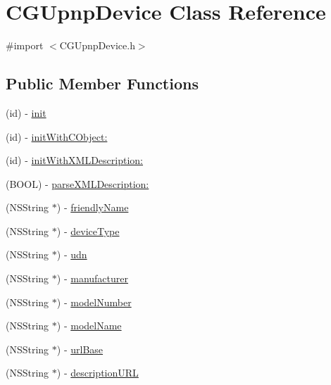 \hypertarget{interface_c_g_upnp_device}{\section{C\-G\-Upnp\-Device Class Reference}
\label{interface_c_g_upnp_device}
}


{\ttfamily \#import $<$C\-G\-Upnp\-Device.\-h$>$}

\subsection*{Public Member Functions}
\begin{DoxyCompactItemize}
\item 
(id) -\/ \hyperlink{interface_c_g_upnp_device_aa0351efbdcee98c85687861faab2d372}{init}
\item 
(id) -\/ \hyperlink{interface_c_g_upnp_device_a4f3984ff48e69ce3c113f960e8a189f6}{init\-With\-C\-Object\-:}
\item 
(id) -\/ \hyperlink{interface_c_g_upnp_device_a0ee734df1783cd9025e7f0efcf3e133f}{init\-With\-X\-M\-L\-Description\-:}
\item 
(B\-O\-O\-L) -\/ \hyperlink{interface_c_g_upnp_device_ac86396c6f776f9436e2b0f92dea8ea03}{parse\-X\-M\-L\-Description\-:}
\item 
(N\-S\-String $\ast$) -\/ \hyperlink{interface_c_g_upnp_device_ae15d569f7de9cbc9aa751d380e2fd8f1}{friendly\-Name}
\item 
(N\-S\-String $\ast$) -\/ \hyperlink{interface_c_g_upnp_device_a626b42555e6122b8ec08877981a9b515}{device\-Type}
\item 
(N\-S\-String $\ast$) -\/ \hyperlink{interface_c_g_upnp_device_ad55f10ba9d5f371835148797fcebfd36}{udn}
\item 
(N\-S\-String $\ast$) -\/ \hyperlink{interface_c_g_upnp_device_a5f496c54e490738ac1d2aac0b1907ca8}{manufacturer}
\item 
(N\-S\-String $\ast$) -\/ \hyperlink{interface_c_g_upnp_device_af1bcb76a0ddf6530179f224802fdab2f}{model\-Number}
\item 
(N\-S\-String $\ast$) -\/ \hyperlink{interface_c_g_upnp_device_ae4b4ac9f466da8f9e7d5567a1f7ac9f2}{model\-Name}
\item 
(N\-S\-String $\ast$) -\/ \hyperlink{interface_c_g_upnp_device_a080173980569b451fafa717eec9fe820}{url\-Base}
\item 
(N\-S\-String $\ast$) -\/ \hyperlink{interface_c_g_upnp_device_ad4f3c7440fb4d70fd945bac3f1aebda9}{description\-U\-R\-L}

\end{DoxyCompactItemize}

